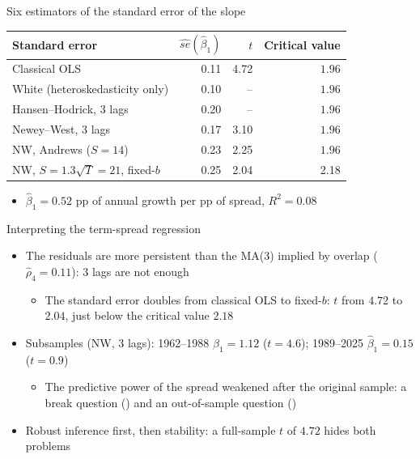 \begin{frame}{Six estimators of the standard error of the slope}
\itemsize{\footnotesize}
\begin{center}
\footnotesize
\begin{tabular}{lrrr}
\toprule
Standard error & $\widehat{se}(\hat\beta_1)$ & $t$ & Critical value \\
\midrule
Classical OLS & 0.11 & 4.72 & $1.96$ \\
White (heteroskedasticity only) & 0.10 & -- & $1.96$ \\
Hansen--Hodrick, 3 lags & 0.20 & -- & $1.96$ \\
Newey--West, 3 lags & 0.17 & 3.10 & $1.96$ \\
NW, Andrews ($S = 14$) & 0.23 & 2.25 & $1.96$ \\
NW, $S = 1.3\sqrt{T} = 21$, fixed-$b$ & 0.25 & 2.04 & 2.18 \\
\bottomrule
\end{tabular}
\end{center}
\begin{itemize}
    \item $\hat\beta_1 = 0.52$ pp of annual growth per pp of spread, $R^2 = 0.08$
\end{itemize}
\end{frame}

\begin{frame}{Interpreting the term-spread regression}
\itemsize{\footnotesize}
\begin{itemize}
    \item The residuals are more persistent than the MA(3) implied by overlap ($\hat\rho_4 = 0.11$): 3 lags are not enough
    \begin{itemize}
        \item The standard error doubles from classical OLS to fixed-$b$: $t$ from $4.72$ to $2.04$, just below the critical value $2.18$
    \end{itemize}
    \item Subsamples (NW, 3 lags): 1962--1988 $\hat\beta_1 = 1.12$ ($t = 4.6$); 1989--2025 $\hat\beta_1 = 0.15$ ($t = 0.9$)
    \begin{itemize}
        \item The predictive power of the spread weakened after the original sample: a break question () and an out-of-sample question ()
    \end{itemize}
    \item Robust inference first, then stability: a full-sample $t$ of $4.72$ hides both problems
\end{itemize}
\end{frame}


